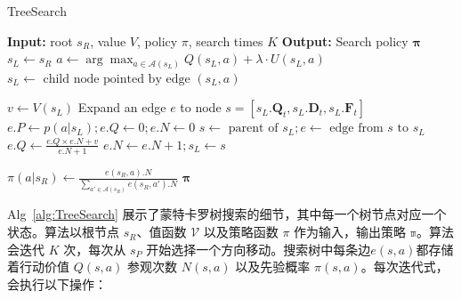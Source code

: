 \begin{algorithm}[!htbp]
\caption{TreeSearch}\label{alg:TreeSearch}

\begin{algorithmic}[1]
\STATE \textbf{Input:} root $s_R$, value $V$, policy $\pi$, search times $K$
\STATE \textbf{Output:} Search policy $\mathbf{\pi}$
\STATE $s_L\leftarrow s_R$
  \STATE $a \leftarrow \arg\max_{a\in\mathcal{A}(s_L)} Q(s_L, a) +\lambda \cdot U(s_L, a)$
  \STATE $s_L \leftarrow \textrm{ child node pointed by edge }(s_L, a)$
\ENDWHILE

    \STATE $v\leftarrow V(s_L)$ 
    \STATE Expand an edge $e$ to node $ s = [s_L.\mathbf{Q}_t, s_L.\mathbf{D}_t, s_L.\mathbf{F}_t]$
    \STATE $e.P \leftarrow p(a|s_L); e.Q \leftarrow 0; e.N \leftarrow  0$
  \ENDFOR
{}
  \STATE $s \leftarrow \textrm{ parent of }s_L; e \leftarrow \textrm{ edge from }s\textrm{ to }s_L$
  \STATE $e.Q \leftarrow \frac{e.Q\times e.N + v}{e.N + 1}$
  \STATE $e.N \leftarrow e.N + 1; s_L \leftarrow s$
\ENDWHILE
\ENDFOR

  \STATE $\pi(a|s_R)\leftarrow \frac{e(s_R, a).N}{\sum_{a'\in\mathcal{A}(s_R)}e(s_R, a').N}$
\ENDFOR
\RETURN $\mathbf{\pi}$
\end{algorithmic}
\end{algorithm}

Alg~\ref{alg:TreeSearch} 展示了蒙特卡罗树搜索的细节，其中每一个树节点对应一个状态。算法以根节点 $s_R$、值函数 $\mathcal{V}$ 以及策略函数 $\pi$ 作为输入，输出策略 $\mathbb{\pi}$。算法会迭代 $K$ 次，每次从 $s_P$ 开始选择一个方向移动。搜索树中每条边$e(s,a)$都存储着行动价值 $Q(s,a)$ 参观次数 $N(s,a)$ 以及先验概率 $\pi(s,a)$。每次迭代式，会执行以下操作：

